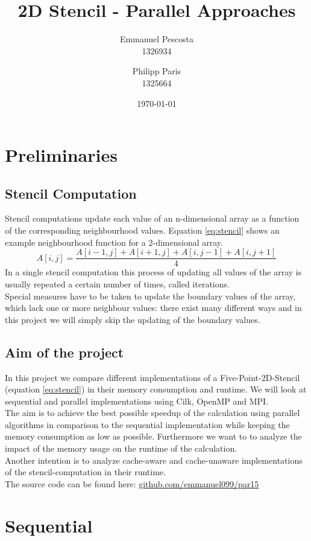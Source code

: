 \documentclass[11pt,a4paper]{article}
\title{2D Stencil - Parallel Approaches}
\author{
  Emmanuel Pescosta\\
  1326934 
  \and
  Philipp Paris\\
  1325664
}
\date{\today}
\begin{document}
\maketitle

\section{Preliminaries}

\subsection{Stencil Computation}
Stencil computations update each value of an n-dimensional array as a function of the corresponding neighbourhood values. Equation \ref{eq:stencil} shows an example neighbourhood function for a 2-dimensional array.
\begin{equation}\label{eq:stencil}
 A[i,j] = \frac{A[i-1,j] + A[i+1,j] + A[i,j-1] + A[i,j+1]}{4}
\end{equation}
In a single stencil computation this process of updating all values of the array is usually repeated a certain number of times, called iterations. \\
Special measures have to be taken to update the boundary values of the array, which lack one or more neighbour values: there exist many different ways and in this project we will simply skip the updating of the boundary values.

\subsection{Aim of the project}
In this project we compare different implementations of a Five-Point-2D-Stencil (equation \ref{eq:stencil}) in their memory consumption and runtime. We will look at sequential and parallel implementations using Cilk, OpenMP and MPI.\\
The aim is to achieve the best possible speedup of the calculation using parallel algorithms in comparison to the sequential implementation while keeping the memory consumption as low as possible. Furthermore we want to to analyze the impact of the memory usage on the runtime of the calculation.\\
Another intention is to analyze cache-aware and cache-unaware implementations of the stencil-computation in their runtime.\\
The source code can be found here: \url{github.com/emmanuel099/par15}

\section{Sequential} \label{section:sequential}
\end{document}
